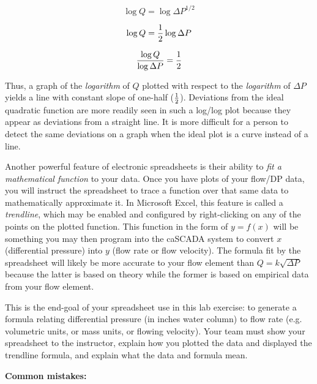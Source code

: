 $$\log Q = \log \Delta P^{1/2}$$

$$\log Q = {1 \over 2} \log \Delta P$$

$${{\log Q} \over {\log \Delta P}} = {1 \over 2}$$

Thus, a graph of the {\it logarithm} of $Q$ plotted with respect to the {\it logarithm} of $\Delta P$ yields a line with constant slope of one-half ($1 \over 2$).  Deviations from the ideal quadratic function are more readily seen in such a log/log plot because they appear as deviations from a straight line.  It is more difficult for a person to detect the same deviations on a graph when the ideal plot is a curve instead of a line.

\vskip 10pt

\filbreak

Another powerful feature of electronic spreadsheets is their ability to {\it fit a mathematical function} to your data.  Once you have plots of your flow/DP data, you will instruct the spreadsheet to trace a function over that same data to mathematically approximate it.  In Microsoft Excel, this feature is called a {\it trendline}, which may be enabled and configured by right-clicking on any of the points on the plotted function.  This function in the form of $y = f(x)$ will be something you may then program into the caSCADA system to convert $x$ (differential pressure) into $y$ (flow rate or flow velocity).  The formula fit by the spreadsheet will likely be more accurate to your flow element than $Q = k \sqrt{\Delta P}$ because the latter is based on theory while the former is based on empirical data from your flow element.

\vskip 10pt

This is the end-goal of your spreadsheet use in this lab exercise: to generate a formula relating differential pressure (in inches water column) to flow rate (e.g. volumetric units, or mass units, or flowing velocity).  Your team must show your spreadsheet to the instructor, explain how you plotted the data and displayed the trendline formula, and explain what the data and formula mean.

\vskip 10pt

{\bf Common mistakes:}

